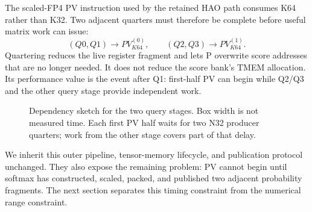 The scaled-FP4 PV instruction used by the retained HAO path consumes K64
rather than K32. Two adjacent quarters must therefore be complete before
useful matrix work can issue:
\begin{equation}
  (Q0,Q1)\rightarrow PV_{K64}^{(0)},\qquad
  (Q2,Q3)\rightarrow PV_{K64}^{(1)}.
  \label{eq:k64-pairs}
\end{equation}
Quartering reduces the live register fragment and lets P overwrite score
addresses that are no longer needed.  It does not reduce the score bank's
TMEM allocation.  Its performance value is the event after Q1: first-half PV
can begin while Q2/Q3 and the other query stage provide independent work.

\begin{figure}[htbp]
\centering
{}
\caption{Dependency sketch for the two query stages. Box width is not
measured time. Each first PV half waits for two N32 producer quarters; work
from the other stage covers part of that delay.}
\label{fig:quarter-pipeline}
\end{figure}

We inherit this outer pipeline, tensor-memory lifecycle, and publication
protocol unchanged.  They also expose the remaining problem: PV cannot begin
until softmax has constructed, scaled, packed, and published two adjacent
probability fragments.  The next section separates this timing constraint
from the numerical range constraint.
